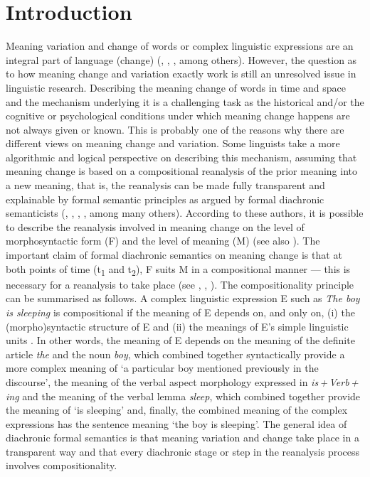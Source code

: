 \chapter{Introduction}\label{sec:1}

Meaning variation and change of words or complex linguistic expressions are an integral part of language (change) (\citealt{Blank1997}, \citealt{Traugott1989}, \citealt{Eckardt2006}, among others). However, the question as to how meaning change and variation exactly work is still an unresolved issue in linguistic research. Describing the meaning change of words in time and space and the mechanism underlying it is a challenging task as the historical and/or the cognitive or psychological conditions under which meaning change happens are not always given or known. This is probably one of the reasons why there are different views on meaning change and variation. Some linguists take a more algorithmic and logical perspective on describing this mechanism, assuming that meaning change is based on a compositional reanalysis of the prior meaning into a new meaning, that is, the reanalysis can be made fully transparent and explainable by formal semantic principles as argued by formal diachronic semanticists (\citealt{Eckardt2006}, \citealt{Bar-asher-siegal2020}, \citealt{Condoravdi2015}, \citealt{Aloni2021}, among many others). According to these authors, it is possible to describe the reanalysis involved in meaning change on the level of morphosyntactic form (F) and the level of meaning (M) (see also \citealt{DetgesEtAl2021}). The important claim of formal diachronic semantics on meaning change is that at both points of time (t\textsubscript{1} and t\textsubscript{2}), F suits M in a compositional manner — this is necessary for a reanalysis to take place (see \citealt{Eckardt2006}, \citealt{Bar-asher-siegal2020}, \citealt{Aloni2021}). The compositionality principle can be summarised as follows. A complex linguistic expression E such as \textit{The boy is sleeping} is compositional if the meaning of E depends on, and only on, (i) the (morpho)syntactic structure of E and (ii) the meanings of E’s simple linguistic units \citep{Frege1997}. In other words, the meaning of E depends on the meaning of the definite article \textit{the} and the noun \textit{boy}, which combined together syntactically provide a more complex meaning of ‘a particular boy mentioned previously in the discourse’, the meaning of the verbal aspect morphology expressed in \textit{is\,+\,\textup{Verb}\,+\,ing} and the meaning of the verbal lemma \textit{sleep}, which combined together provide the meaning of ‘is sleeping’ and, finally, the combined meaning of the complex expressions has the sentence meaning ‘the boy is sleeping’. The general idea of diachronic formal semantics is that meaning variation and change take place in a transparent way and that every diachronic stage or step in the reanalysis process involves compositionality.


